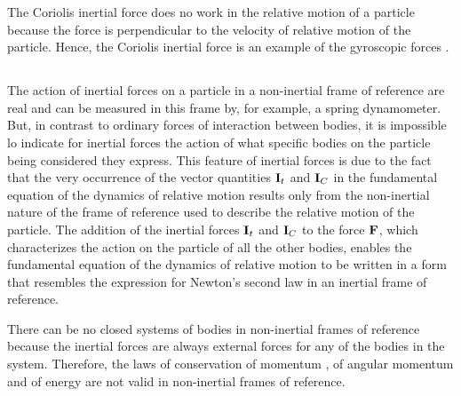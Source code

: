The Coriolis inertial force does no work in the relative motion of a particle because the force is perpendicular to the velocity of relative motion of the particle. Hence, the Coriolis inertial force is an example of the gyroscopic forces .

\subsection{}\label{7.2.5} The action of inertial forces on a particle in a non-inertial frame of reference are real and can be measured in this frame by, for example, a spring dynamometer. But, in contrast to ordinary forces of interaction between bodies, it is impossible lo indicate for inertial forces the action of what specific bodies on the particle being considered they express. This feature of inertial forces is due to the fact that the very occurrence of the vector quantities $\vb{I}_{t}$ and $\vb{I}_{C}$ in the fundamental equation of the dynamics of relative motion results only from the non-inertial nature of the frame of reference used to describe the relative motion of the particle. The addition of the inertial forces $\vb{I}_{t}$ and $\vb{I}_{C}$ to the force $\vb{F}$, which characterizes the action on the particle of all the other bodies, enables the fundamental equa­tion of the dynamics of relative motion to be written in a form that resembles the expression for Newton's second law in an inertial frame of reference.

There can be no closed systems of bodies in non-inertial frames of reference because the inertial forces are always external forces for any of the bodies in the system. Therefore, the laws of conservation of momentum , of angular momentum  and of energy  are not valid in non-inertial frames of reference.

